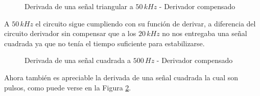 \begin{figure}[H]
	\begin{center}
		\caption{Derivada de una señal triangular a $50 \,kHz$ - Derivador compensado}
		\label{fig:derivtriangCOMP50kHz}
	\end{center}
\end{figure}

A $50 \, kHz$ el circuito sigue cumpliendo con su función de derivar, a diferencia del circuito derivador sin compensar que a los $20 \, kHz$ no nos entregaba una señal cuadrada ya que no tenía el tiempo suficiente para estabilizarse.

\begin{figure}[H]
	\begin{center}
		\caption{Derivada de una señal cuadrada a $500 \,Hz$ - Derivador compensado}
		\label{fig:derivCUAdradaCOMP}
	\end{center}
\end{figure}

Ahora también es apreciable la derivada de una señal cuadrada la cual son pulsos, como puede verse en la Figura \ref{fig:derivCUAdradaCOMP}.

